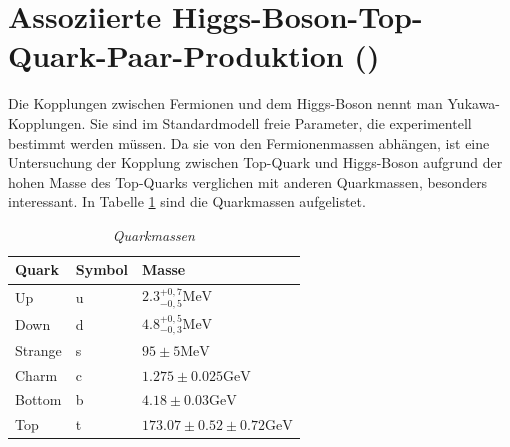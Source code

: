 \section{Assoziierte Higgs-Boson-Top-Quark-Paar-Produktion (\ttH)}
\label{ch:Theorie:sec:ttH}

Die Kopplungen zwischen Fermionen und dem Higgs-Boson nennt man Yukawa-Kopplungen.
Sie sind im Standardmodell freie Parameter, die experimentell bestimmt werden m\"ussen. Da sie von den Fermionenmassen abh\"angen, ist eine Untersuchung der Kopplung zwischen Top-Quark und Higgs-Boson aufgrund der hohen Masse des Top-Quarks verglichen mit anderen Quarkmassen, besonders interessant. In Tabelle \ref{tab:quarkmasse} sind die Quarkmassen aufgelistet.\\

\begin{table}[hhh]\parbox{12cm}{
  \caption[Quarkmassen]{\it Quarkmassen {\rm \cite{Agashe:2014kda}}
  }\label{tab:quarkmasse}}
  \begin{center}
  \begin{tabular}{lll}
  \hline
  {\bf Quark} & {\bf Symbol} & {\bf Masse}  \\
  \hline \hline
     Up		& u & $\num{2,3}^{{+0,7}}_{{-0,5}}\si{\mega\electronvolt}$ \\
     Down	& d & $\num{4,8}^{{+0,5}}_{{-0,3}}\si{\mega\electronvolt}$ \\
     Strange& s & $\num{95}\pm \num{5}\si{\mega\electronvolt}$ \\
     Charm	& c & $\num{1,275}\pm \num{0,025}\si{\giga\electronvolt}$ \\ 
  	 Bottom & b & $\num{4,18}\pm \num{0,03}\si{\giga\electronvolt}$ \\
     Top    & t & $\num{173,07}\pm \num{0,52}\pm \num{0,72}\si{\giga\electronvolt}$\\                                
  \hline
  \end{tabular}
  \end{center}
\end{table}

